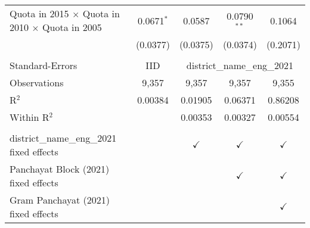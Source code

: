 \begin{tabular}{lcccc}
   Quota in 2015 $\times$ Quota in 2010 $\times$ Quota in 2005   & 0.0671$^{*}$   & 0.0587         & 0.0790$^{**}$  & 0.1064\\   
                                                                 & (0.0377)       & (0.0375)       & (0.0374)       & (0.2071)\\   
    \\
   Standard-Errors & IID & \multicolumn{3}{c}{district\_name\_eng\_2021} \\ 
   Observations                                                  & 9,357          & 9,357          & 9,357          & 9,355\\  
   R$^2$                                                         & 0.00384        & 0.01905        & 0.06371        & 0.86208\\  
   Within R$^2$                                                  &                & 0.00353        & 0.00327        & 0.00554\\  
    \\
   district\_name\_eng\_2021 fixed effects                       &                & $\checkmark$   & $\checkmark$   & $\checkmark$\\   
   Panchayat Block (2021) fixed effects                          &                &                & $\checkmark$   & $\checkmark$\\   
   Gram Panchayat (2021) fixed effects                           &                &                &                & $\checkmark$\\   
   \bottomrule
\end{tabular}
\par\endgroup


